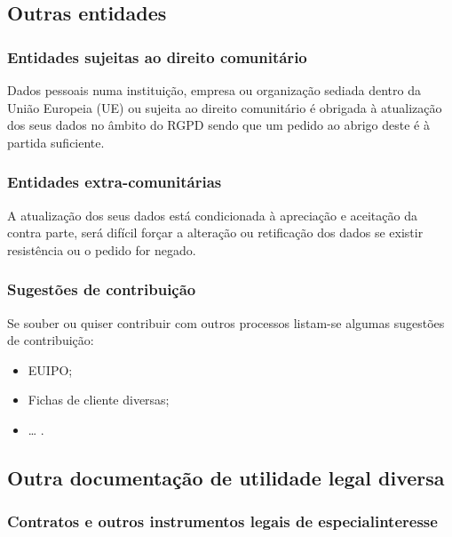 \subsection{Outras entidades}

\subsubsection{Entidades sujeitas ao direito comunitário}

Dados pessoais numa instituição, empresa ou organização sediada dentro
da União Europeia (UE) ou sujeita ao direito comunitário é obrigada à
atualização dos seus dados no âmbito do RGPD sendo que um pedido ao
abrigo deste é à partida suficiente.

\subsubsection{Entidades extra-comunitárias}

A atualização dos seus dados está condicionada à apreciação e aceitação
da contra parte, será difícil forçar a alteração ou retificação dos
dados se existir resistência ou o pedido for negado.

\subsubsection{Sugestões de contribuição}

Se souber ou quiser contribuir com outros processos listam-se algumas
sugestões de contribuição:
\begin{itemize}
	\item EUIPO;
	\item Fichas de cliente diversas;
	\item \ldots{} .
\end{itemize}

\subsection{Outra documentação de utilidade legal diversa}

\subsubsection{Contratos e outros instrumentos legais de especialinteresse}

